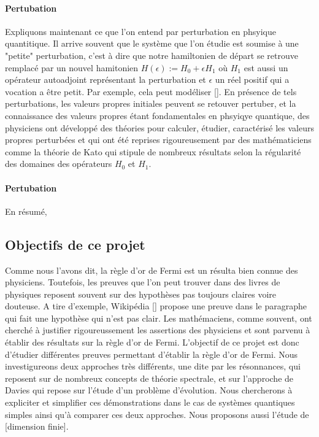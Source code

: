 \documentclass[12pt,openany,a4paper, titlepage]{article}
\theoremstyle{definition}
\theoremstyle{definition}
\theoremstyle{definition}
\theoremstyle{definition}
\theoremstyle{definition}
\theoremstyle{definition}
\begin{document}
\paragraph{Pertubation}
Expliquons maintenant ce que l'on entend par perturbation en phsyique quantitique. Il arrive souvent que le système que l'on étudie est soumise à une "petite" perturbation, c'est à dire que notre hamiltonien de départ se retrouve remplacé par un nouvel hamitonien $H(\epsilon) := H_0 + \epsilon H_1$ où $H_1$ est aussi un opérateur autoadjoint représentant la perturbation et $\epsilon$ un réel positif qui a vocation a être petit.  Par exemple, cela peut modéliser []. En présence de tels perturbations, les valeurs propres initiales peuvent se retouver pertuber, et la connaissance des valeurs propres étant fondamentales en phsyiqye quantique, des physiciens ont développé des théories pour calculer, étudier, caractérisé les valeurs propres perturbées et qui ont été reprises rigoureusement par des mathématiciens comme la théorie de Kato qui stipule de nombreux résultats selon la régularité des domaines des opérateurs $H_0$ et $H_1$. 

\paragraph{Pertubation}


En résumé, 

\subsection{Objectifs de ce projet}

Comme nous l'avons dit, la règle d'or de Fermi est un résulta bien connue des physiciens. Toutefois, les preuves que l'on peut trouver dans des livres de physiques reposent souvent sur des hypothèses pas toujours claires voire douteuse. A tire d'exemple, Wikipédia [] propose une preuve dans le paragraphe qui fait une hypothèse qui n'est pas clair. Les mathémaciens, comme souvent, ont cherché à justifier rigoureussement les assertions des physiciens et sont parvenu à établir des résultats sur la règle d'or de Fermi. L'objectif de ce projet est donc d'étudier différentes preuves permettant d'établir la règle d'or de Fermi. Nous investigureons deux approches très différents, une dite par les résonnances, qui reposent sur de nombreux concepts de théorie spectrale, et sur l'approche de Davies qui repose sur l'étude d'un problème d'évolution. Nous chercherons à expliciter et simplifier ces démonstrations  dans le cas de systèmes quantiques simples ainsi qu'à comparer ces deux approches. Nous proposons aussi l'étude de [dimension finie]. 
\end{document}

